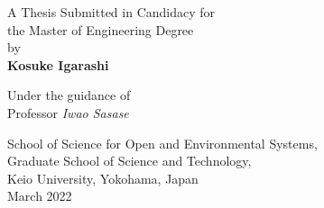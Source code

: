 \pagestyle{empty}
\begin{center}

\vspace{1cm}
\setlength{\textwidth}{2zw}
\Large
{\bf \PAPERTITLE}

\vspace{2cm}

A Thesis Submitted in Candidacy for \\
the Master of Engineering Degree \\
by \\
{\bf Kosuke Igarashi}\\[.1in]

\vspace{1cm}

Under the guidance of
\\Professor {\it Iwao Sasase}\\

\vspace{1cm}

School of Science for Open and Environmental Systems, \\
Graduate School of Science and Technology, \\
Keio University, Yokohama, Japan \\
March 2022

\end{center}

